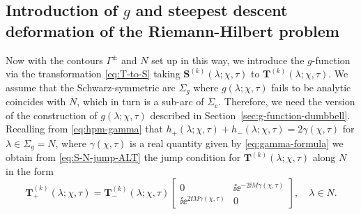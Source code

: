 \subsection{Introduction of $g$ and steepest descent deformation of the Riemann-Hilbert problem}
Now with the contours $\Gamma^\pm$ and $N$ set up in this way, we introduce the $g$-function via the transformation \eqref{eq:T-to-S} 
taking $\mathbf{S}^{(k)}(\lambda;\chi,\tau)$ to $\mathbf{T}^{(k)}(\lambda;\chi,\tau)$.  We assume that the Schwarz-symmetric arc $\Sigma_g$ where $g(\lambda;\chi,\tau)$ fails to be analytic coincides with $N$, which in turn is a sub-arc of $\Sigma_\mathrm{c}$.  Therefore, we need the version of the construction of $g(\lambda;\chi,\tau)$ described in Section~\ref{sec:g-function-dumbbell}.  Recalling from \eqref{eq:hpm-gamma} that $h_+(\lambda;\chi,\tau)+h_-(\lambda;\chi,\tau)=2\gamma(\chi,\tau)$ for $\lambda\in\Sigma_g=N$, where 
$\gamma(\chi,\tau)$
is a real quantity 
given by \eqref{eq:gamma-formula}
we obtain from \eqref{eq:S-N-jump-ALT} the jump condition for $\mathbf{T}^{(k)}(\lambda;\chi,\tau)$ along $N$ in the form
\begin{equation}
\mathbf{T}^{(k)}_+(\lambda;\chi,\tau)=\mathbf{T}^{(k)}_-(\lambda;\chi,\tau)\begin{bmatrix}
0 & \ii\ee^{-2\ii M\gamma(\chi,\tau)}\\\ii\ee^{2\ii M\gamma(\chi,\tau)} & 0\end{bmatrix},\quad\lambda\in N.
\label{eq:T-jump-N-Schi-Stau-ALT}
\end{equation}
